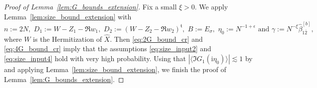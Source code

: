 \documentclass[10pt]{amsart}
\numberwithin{equation}{section}
\newcommand{\ii}{\mathrm{i}}
\newcommand{\mt}{\mathfrak{t}}
\begin{document}
\begin{proof}[Proof of Lemma~\ref{lem:G_bounds_extension}] Fix a small $\xi>0$. We apply Lemma~\ref{lem:size_bound_extension} with
\begin{equation*}
n:=2N, \,\,D_1:=W-Z_1-\Re w_1,\,\, D_2:=(W-Z_2-\Re w_2)^\mt,\,\, B:=E_\sigma,\,\,\eta_0:=N^{-1+\epsilon}\,\,\text{and}\,\,\gamma:=N^{-\xi}\widehat{\beta}_{1\overline{2}}^{[b]},
\end{equation*}
where $W$ is the Hermitization of $\widehat{X}$. Then \eqref{eq:2G_bound_cr} and \eqref{eq:4G_bound_cr} imply that the assumptions \eqref{eq:size_input2} and \eqref{eq:size_input4} hold with very high probability. Using that $|\langle \Im G_1(\ii\eta_0)\rangle|\lesssim 1$ by \cite[Lemma~B.7]{cipolloni2024maximum} and applying Lemma~\ref{lem:size_bound_extension}, we finish the proof of Lemma~\ref{lem:G_bounds_extension}.
\end{proof}
\end{document}
